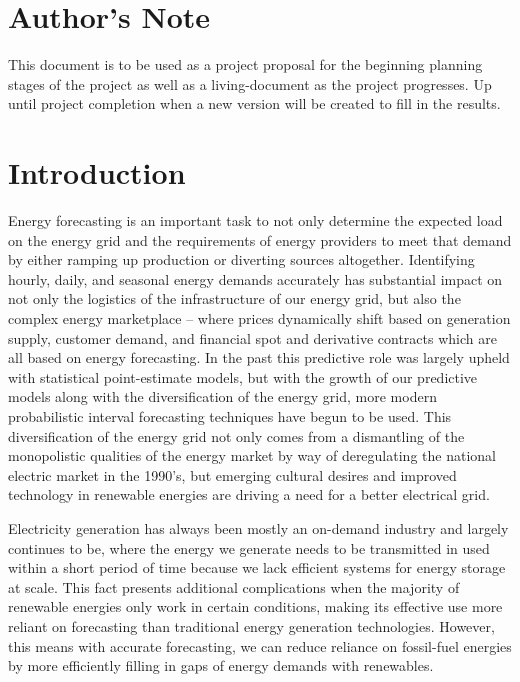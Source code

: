 \documentclass[sigconf]{acmart}
\begin{document}
\maketitle

\section{Author's Note}
This document is to be used as a project proposal for the beginning planning stages of the project as well as a living-document as the project progresses. Up until project completion when a new version will be created to fill in the results.

\section{Introduction}
Energy forecasting is an important task to not only determine the expected load on the energy grid and the requirements of energy providers to meet that demand by either ramping up production or diverting sources altogether.\cite{Hong16} Identifying hourly, daily, and seasonal energy demands accurately has substantial impact on not only the logistics of the infrastructure of our energy grid, but also the complex energy marketplace -- where prices dynamically shift based on generation supply, customer demand, and financial spot and derivative contracts which are all based on energy forecasting.\cite{Bunn04} In the past this predictive role was largely upheld with statistical point-estimate models, but with the growth of our predictive models along with the diversification of the energy grid, more modern probabilistic interval forecasting techniques have begun to be used.\cite{Lee21, Weron14, Hong16} This diversification of the energy grid not only comes from a dismantling of the monopolistic qualities of the energy market by way of deregulating the national electric market in the 1990's, but emerging cultural desires and improved technology in renewable energies are driving a need for a better electrical grid.\cite{Joskow01}

Electricity generation has always been mostly an on-demand industry and largely continues to be, where the energy we generate needs to be transmitted in used within a short period of time because we lack efficient systems for energy storage at scale.\cite{Lai21} This fact presents additional complications when the majority of renewable energies only work in certain conditions, making its effective use more reliant on forecasting than traditional energy generation technologies. However, this means with accurate forecasting, we can reduce reliance on fossil-fuel energies by more efficiently filling in gaps of energy demands with renewables.
\end{document}
